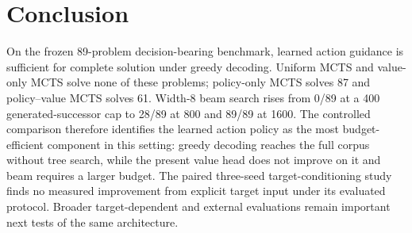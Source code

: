 \documentclass[11pt]{article}
\numberwithin{equation}{section}
\begin{document}
\section{Conclusion}

On the frozen 89-problem decision-bearing benchmark, learned action guidance is sufficient for complete solution under greedy decoding. Uniform MCTS and value-only MCTS solve none of these problems; policy-only MCTS solves 87 and policy--value MCTS solves 61. Width-8 beam search rises from 0/89 at a 400 generated-successor cap to 28/89 at 800 and 89/89 at 1600. The controlled comparison therefore identifies the learned action policy as the most budget-efficient component in this setting: greedy decoding reaches the full corpus without tree search, while the present value head does not improve on it and beam requires a larger budget. The paired three-seed target-conditioning study finds no measured improvement from explicit target input under its evaluated protocol. Broader target-dependent and external evaluations remain important next tests of the same architecture.
\end{document}
